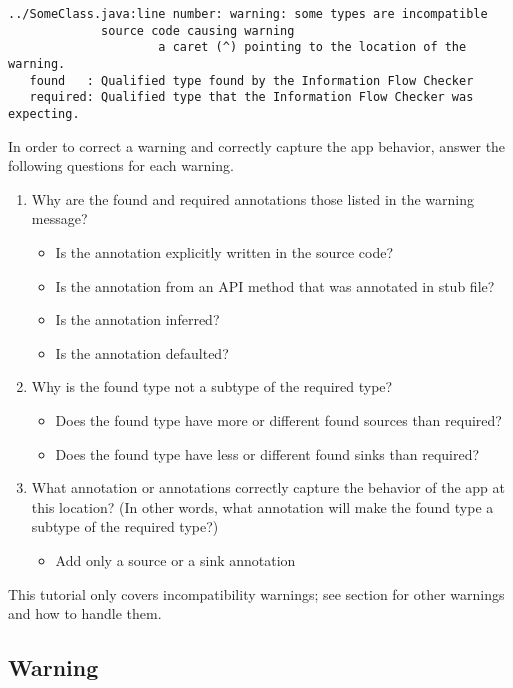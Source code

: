 \begin{Verbatim}  
../SomeClass.java:line number: warning: some types are incompatible 
             source code causing warning
                     a caret (^) pointing to the location of the warning.
   found   : Qualified type found by the Information Flow Checker
   required: Qualified type that the Information Flow Checker was expecting.
\end{Verbatim}
 
In order to correct a warning and correctly capture the app behavior, answer 
the following questions for each warning.
\begin{enumerate}
\item Why are the found and required annotations those listed in the warning message?
   \begin{itemize}
    \item Is the annotation explicitly written in the source code? 
    \item Is the annotation from an API method that was annotated in stub file? 
    \item Is the annotation inferred? 
    \item Is the annotation defaulted? 
    \end{itemize}
\item Why is the found type not a subtype of the required type? 
  \begin{itemize}
   \item Does the found type have more or different found sources than required?
   \item Does the found type have less or different found sinks than required? 
   \end{itemize}
\item What annotation or annotations correctly capture the behavior of the app at
  this location? (In other words, what annotation will make the found type a 
  subtype of the required type?)
   \begin{itemize}
   \item Add only a source or a sink annotation
   \end{itemize}
\end{enumerate}

This tutorial only covers incompatibility warnings; see section  for 
other warnings and how to handle them.

\subsection{Warning }

